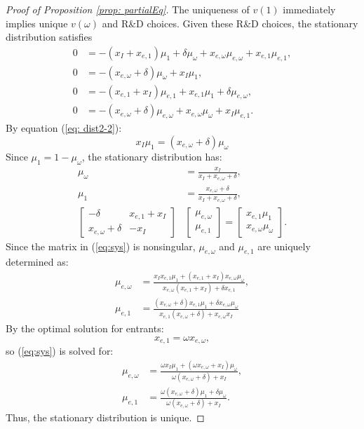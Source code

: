 \begin{proof}[Proof of Proposition \ref{prop: partialEq}]
The uniqueness of $v(1)$ immediately implies unique $v(\omega)$
and R\&D choices. Given these R\&D choices, the stationary distribution
satisfies 
\begin{align}
0 & =-\left(x_{I}+x_{e,1}\right)\mu_{1}+\delta\mu_{\omega}+x_{e,\omega}\mu_{e,\omega}+x_{e,1}\mu_{e,1},\label{eq: dist1-2}\\
0 & =-\left(x_{e,\omega}+\delta\right)\mu_{\omega}+x_{I}\mu_{1},\label{eq: dist2-2}\\
0 & =-\left(x_{e,1}+x_{I}\right)\mu_{e,1}+x_{e,1}\mu_{1}+\delta\mu_{e,\omega},\label{eq: dist3-3}\\
0 & =-\left(x_{e,\omega}+\delta\right)\mu_{e,\omega}+x_{e,\omega}\mu_{\omega}+x_{I}\mu_{e,1}.\label{eq: dist4-3}
\end{align}
By equation (\ref{eq: dist2-2}):
\[
x_{I}\mu_{1}=\left(x_{e,\omega}+\delta\right)\mu_{\omega}
\]
Since $\mu_{1}=1-\mu_{\omega}$, the stationary distribution has:
\begin{align}
\mu_{\omega} & =\frac{x_{I}}{x_{I}+x_{e,\omega}+\delta},\nonumber \\
\mu_{1} & =\frac{x_{e,\omega}+\delta}{x_{I}+x_{e,\omega}+\delta},\nonumber \\
\left[\begin{matrix}-\delta & x_{e,1}+x_{I}\\
x_{e,\omega}+\delta & -x_{I}
\end{matrix}\right] & \left[\begin{matrix}\mu_{e,\omega}\\
\mu_{e,1}
\end{matrix}\right]=\left[\begin{matrix}x_{e,1}\mu_{1}\\
x_{e,\omega}\mu_{\omega}
\end{matrix}\right].\label{eq:sys}
\end{align}
Since the matrix in (\ref{eq:sys}) is nonsingular, $\mu_{e,\omega}$
and $\mu_{e,1}$ are uniquely determined as: 
\begin{align*}
\mu_{e,\omega} & =\frac{x_{I}x_{e,1}\mu_{1}+\left(x_{e,1}+x_{I}\right)x_{e,\omega}\mu_{\omega}}{x_{e,\omega}\left(x_{e,1}+x_{I}\right)+\delta x_{e,1}},\\
\mu_{e,1} & =\frac{\left(x_{e,\omega}+\delta\right)x_{e,1}\mu_{1}+\delta x_{e,\omega}\mu_{\omega}}{x_{e,1}\left(x_{e,\omega}+\delta\right)+x_{e,\omega}x_{I}}
\end{align*}
By the optimal solution for entrants:
\[
x_{e,1}=\omega x_{e,\omega},
\]
so (\ref{eq:sys}) is solved for:
\begin{align}
\mu_{e,\omega} & =\frac{\omega x_{I}\mu_{1}+\left(\omega x_{e,\omega}+x_{I}\right)\mu_{\omega}}{\omega\left(x_{e,\omega}+\delta\right)+x_{I}},\label{eq: mu_e_om}\\
\mu_{e,1} & =\frac{\omega\left(x_{e,\omega}+\delta\right)\mu_{1}+\delta\mu_{\omega}}{\omega\left(x_{e,\omega}+\delta\right)+x_{I}}.\label{eq: mu_e_1}
\end{align}
Thus, the stationary distribution is unique. 


\end{proof}
